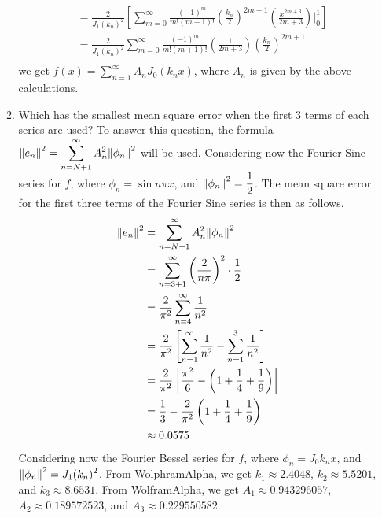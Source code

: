 \documentclass[a4paper]{article}
\newcommand{\ds}{\displaystyle}
\begin{document}
\begin{enumerate}
\begin{enumerate}
\begin{align*}
			& = \frac{2}{J_{1}(k_n)^2}\left[\sum^{\infty}_{m=0} \frac{(-1)^m}{m!(m+1)!}\left(\frac{k_n}{2}\right)^{2m+1}\left(\frac{x^{2m+3}}{2m+3} \right)\Bigg|^1_0 \right]\\
			& = \frac{2}{J_{1}(k_n)^2}\sum^{\infty}_{m=0} \frac{(-1)^m}{m!(m+1)!}\left(\frac{1}{2m+3} \right)\left(\frac{k_n}{2}\right)^{2m+1}\\
		\end{align*}
		we get $\ds{f(x) = \sum^{\infty}_{n=1}A_nJ_0(k_nx)}$, where $\ds{A_n}$ is given by the above calculations.

		\pagebreak

		\item Which has the smallest mean square error when the first 3 terms of each series are used?
		\bigbreak
		To answer this question, the formula $\ds{\norm{e_n}^2 = \sum^{\infty}_{n=N+1}A_n^2\norm{\phi_n}^2}$ will be used. 
		\bigbreak
		Considering now the Fourier Sine series for $\ds{f}$, where $\ds{\phi_n = \sin{n\pi x}}$, and $\ds{\norm{\phi_n}^2 = \frac{1}{2}}$. The mean square error for the first three terms of the Fourier Sine series is then as follows.
		\begin{align*}
			\norm{e_n}^2 & = \sum^{\infty}_{n=N+1}A_n^2\norm{\phi_n}^2\\
			& = \sum^{\infty}_{n=3+1}\left(\frac{2}{n\pi}\right)^2\cdot\frac{1}{2}\\
			& = \frac{2}{\pi^2}\sum^{\infty}_{n=4}\frac{1}{n^2}\\
			& = \frac{2}{\pi^2}\left[\sum^{\infty}_{n=1}\frac{1}{n^2} - \sum^{3}_{n=1}\frac{1}{n^2}\right]\\
			& = \frac{2}{\pi^2}\left[\frac{\pi^2}{6} - \left(1+\frac{1}{4}+\frac{1}{9}\right)\right]\\
			& = \frac{1}{3} - \frac{2}{\pi^2}\left(1+\frac{1}{4}+\frac{1}{9}\right)\\
			& \approx 0.0575\\
		\end{align*}
		\bigbreak
		Considering now the Fourier Bessel series for $\ds{f}$, where $\ds{\phi_n = J_0{k_n x}}$, and $\ds{\norm{\phi_n}^2 = J_1(k_n)^2}$. From WolphramAlpha, we get $\ds{k_1 \approx 2.4048}$, $\ds{k_2 \approx 5.5201}$, and $\ds{k_3 \approx 8.6531}$. From WolframAlpha, we get $\ds{A_1 \approx 0.943296057}$, $\ds{A_2 \approx 0.189572523}$, and $\ds{A_3 \approx 0.229550582}$.


\end{enumerate}
\end{enumerate}
\end{document}
